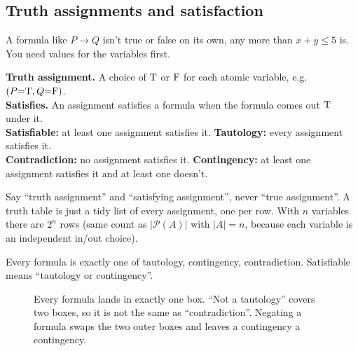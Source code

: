\subsection{Truth assignments and satisfaction}

A formula like $P\to Q$ isn't true or false on its own, any more than $x+y\leq5$ is. You need values for the variables first.

\begin{notebox}
\textbf{Truth assignment.} A choice of $\mathrm{T}$ or $\mathrm{F}$ for each atomic variable, e.g.\ $(P{=}\mathrm{T},Q{=}\mathrm{F})$.\\
\textbf{Satisfies.} An assignment satisfies a formula when the formula comes out $\mathrm{T}$ under it.\\
\textbf{Satisfiable:} at least one assignment satisfies it.\quad
\textbf{Tautology:} every assignment satisfies it.\\
\textbf{Contradiction:} no assignment satisfies it.\quad
\textbf{Contingency:} at least one assignment satisfies it and at least one doesn't.
\end{notebox}

Say ``truth assignment'' and ``satisfying assignment'', never ``true assignment''. A truth table is just a tidy list of every assignment, one per row. With $n$ variables there are $2^n$ rows (same count as $|\mathcal{P}(A)|$ with $|A|=n$, because each variable is an independent in/out choice).

Every formula is exactly one of tautology, contingency, contradiction. Satisfiable means ``tautology or contingency''.

\begin{figure}[htb]
\centering
{}
\caption{Every formula lands in exactly one box. ``Not a tautology'' covers two boxes, so it is not the same as ``contradiction''. Negating a formula swaps the two outer boxes and leaves a contingency a contingency.}
\end{figure}

